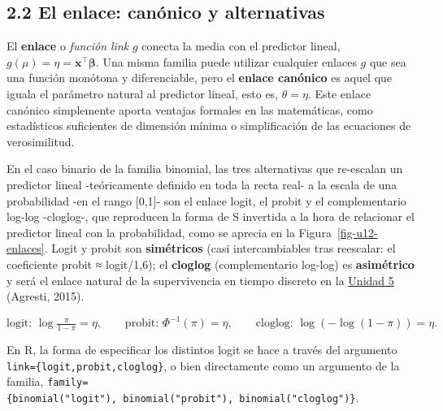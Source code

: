 \documentclass[
  letterpaper,
  DIV=11,
  numbers=noendperiod]{scrartcl}
\begin{document}
\hypertarget{sec-u12-enlace}{%
\subsection{2.2 El enlace: canónico y
alternativas}\label{sec-u12-enlace}}

El \textbf{enlace} o \emph{función link} \(g\) conecta la media con el
predictor lineal, \(g(\mu)=\eta=\mathbf{x}^\top \boldsymbol\beta\). Una
misma familia puede utilizar cualquier enlaces \(g\) que sea una función
monótona y diferenciable, pero el \textbf{enlace canónico} es aquel que
iguala el parámetro natural al predictor lineal, esto es,
\(\theta=\eta\). Este enlace canónico simplemente aporta ventajas
formales en las matemáticas, como estadísticos suficientes de dimensión
mínima o simplificación de las ecuaciones de verosimilitud.

En el caso binario de la familia binomial, las tres alternativas que
re-escalan un predictor lineal -teóricamente definido en toda la recta
real- a la escala de una probabilidad -en el rango {[}0,1{]}- son el
enlace logit, el probit y el complementario log-log -cloglog-, que
reproducen la forma de S invertida a la hora de relacionar el predictor
lineal con la probabilidad, como se aprecia en la
Figura~\ref{fig-u12-enlaces}. Logit y probit son \textbf{simétricos}
(casi intercambiables tras reescalar: el coeficiente probit ≈
logit/1,6); el \textbf{cloglog} (complementario log-log) es
\textbf{asimétrico} y será el enlace natural de la supervivencia en
tiempo discreto en la \protect\hyperlink{sec-u15}{Unidad 5} (Agresti,
2015).

\[
\text{logit: }\log\tfrac{\pi}{1-\pi}=\eta,\qquad
\text{probit: }\Phi^{-1}(\pi)=\eta,\qquad
\text{cloglog: }\log(-\log(1-\pi))=\eta .
\]

\begin{tcolorbox}[enhanced jigsaw, coltitle=black, rightrule=.15mm, arc=.35mm, leftrule=.75mm, colback=white, colbacktitle=quarto-callout-tip-color!10!white, left=2mm, breakable, toptitle=1mm, toprule=.15mm, bottomtitle=1mm, titlerule=0mm, title=\textcolor{quarto-callout-tip-color}{\faLightbulb}\hspace{0.5em}{🔧 En R. Especificar el enlace (logit, probit, cloglog)}, bottomrule=.15mm, opacityback=0, opacitybacktitle=0.6, colframe=quarto-callout-tip-color-frame]

En R, la forma de especificar los distintos logit se hace a través del
argumento
\texttt{link=\{\textquotesingle{}logit\textquotesingle{},\textquotesingle{}probit\textquotesingle{},\textquotesingle{}cloglog\textquotesingle{}\}},
o bien directamente como un argumento de la familia,
\texttt{family=\{binomial("logit"),\ binomial("probit"),\ binomial("cloglog")\}}.

\end{tcolorbox}
\end{document}
